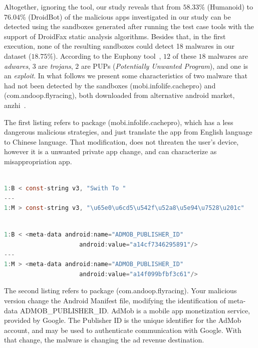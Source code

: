 Altogether, ignoring the \joke tool, our study reveals that from $58.33$\% (Humanoid)
to $76.04$\% (DroidBot) of the malicious apps investigated in our study can be
detected using the sandboxes generated after running the test case tools with the support of DroidFax static analysis algorithms. Besides that, in the first execution, none of the resulting sandboxes could detect 18 malwares in our dataset ($18.75$\%). According to the Euphony tool~\cite{hurier2017euphony}, $12$ of these $18$ malwares are \emph{adwares}, $3$ are \emph{trojans}, $2$ are PUPs (\emph{Potentially Unwanted Program}), and one is an \emph{exploit}. In what follows we present some characteristics of two malware that had not been detected by the sandboxes (mobi.infolife.cachepro) and (com.andoop.flyracing), both downloaded from alternative android market, anzhi~\cite{anzhi}.

The first listing refers to package (mobi.infolife.cachepro), which has a less dangerous malicious strategies, and just translate the app from English language to Chinese language. That modification, does not threaten the user's device, however it is a unwanted private app change, and can characterize as misappropriation app.

\begin{lstlisting}[caption= smali/mobi/infolife/cachepro/h.smali - (mobi.infolife.cachepro),language=Java, basicstyle=\fontsize{8}{6}\selectfont\ttfamily,label={lst:mobi.infolife.cachepro}]

1:B < const-string v3, "Swith To "
---
1:M > const-string v3, "\u65e0\u6cd5\u542f\u52a8\u5e94\u7528\u201c"
\end{lstlisting}

\begin{lstlisting}[caption=AndroidManifest.xml - (com.andoop.flyracing), language=Java, basicstyle=\fontsize{8}{6}\selectfont\ttfamily,label={lst:app65}]

1:B < <meta-data android:name="ADMOB_PUBLISHER_ID"
                     android:value="a14cf7346295891"/>
---
1:M > <meta-data android:name="ADMOB_PUBLISHER_ID"
                     android:value="a14f099bfbf3c61"/>
\end{lstlisting}


The second listing refers to package (com.andoop.flyracing). Your malicious version change the Android Manifest file, modifying the identification of meta-data ADMOB\_PUBLISHER\_ID. AdMob \cite{admob} is a mobile app monetization service, provided by Google. The Publisher ID \cite{publisherID} is the unique identifier for the AdMob account, and may be used to authenticate communication with Google. With that change, the malware is changing the ad revenue destination. 


